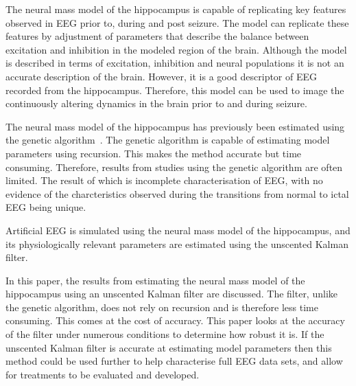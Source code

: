 
The neural mass model of the hippocampus is capable of replicating key features observed in EEG prior to, during and post seizure. The model can replicate these features by adjustment of parameters that describe the balance between excitation and inhibition in the modeled region of the brain. Although the model is described in terms of excitation, inhibition and neural populations it is not an accurate description of the brain. However, it is a good descriptor of EEG recorded from the hippocampus. Therefore, this model can be used to image the continuously altering dynamics in the brain prior to and during seizure.


The neural mass model of the hippocampus has previously been estimated using the genetic algorithm~\citep{wendling2005interictal}. The genetic algorithm is capable of estimating model parameters using recursion. This makes the method accurate but time consuming. Therefore, results from studies using the genetic algorithm are often limited. The result of which is incomplete characterisation of EEG, with no evidence of the charcteristics observed during the transitions from normal to ictal EEG being unique.





Artificial EEG is simulated using the neural mass model of the hippocampus, and its physiologically relevant parameters are estimated using the unscented Kalman filter.

In this paper, the results from estimating the neural mass model of the hippocampus using an unscented Kalman filter are discussed. The filter, unlike the genetic algorithm, does not rely on recursion and is therefore less time consuming. This comes at the cost of accuracy. This paper looks at the accuracy of the filter under numerous conditions to determine how robust it is. If the unscented Kalman filter is accurate at estimating model parameters then this method could be used further to help characterise full EEG data sets, and allow for treatments to be evaluated and developed.

